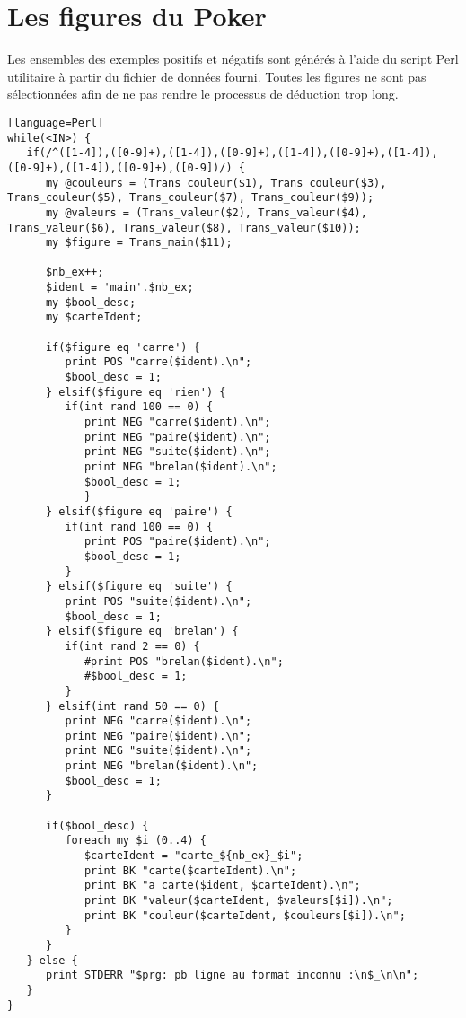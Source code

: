 \documentclass[a4paper,12pt]{article}
\begin{document}
\section{Les figures du Poker}

Les ensembles des exemples positifs et négatifs sont générés à l'aide du script Perl utilitaire à partir du fichier de données fourni. Toutes les figures ne sont pas sélectionnées afin de ne pas rendre le processus de déduction trop long.

\begin{lstlisting}[frame=single][language=Perl]
while(<IN>) {
   if(/^([1-4]),([0-9]+),([1-4]),([0-9]+),([1-4]),([0-9]+),([1-4]),([0-9]+),([1-4]),([0-9]+),([0-9])/) {
      my @couleurs = (Trans_couleur($1), Trans_couleur($3), Trans_couleur($5), Trans_couleur($7), Trans_couleur($9));
      my @valeurs = (Trans_valeur($2), Trans_valeur($4), Trans_valeur($6), Trans_valeur($8), Trans_valeur($10));
      my $figure = Trans_main($11);

      $nb_ex++;
      $ident = 'main'.$nb_ex;
      my $bool_desc;
      my $carteIdent;

      if($figure eq 'carre') {
         print POS "carre($ident).\n";
         $bool_desc = 1;
      } elsif($figure eq 'rien') {
         if(int rand 100 == 0) {
            print NEG "carre($ident).\n";
            print NEG "paire($ident).\n";
            print NEG "suite($ident).\n";
            print NEG "brelan($ident).\n";
            $bool_desc = 1;
            }
      } elsif($figure eq 'paire') {
         if(int rand 100 == 0) {
            print POS "paire($ident).\n";
            $bool_desc = 1;
         }
      } elsif($figure eq 'suite') {
         print POS "suite($ident).\n";
         $bool_desc = 1;
      } elsif($figure eq 'brelan') {
         if(int rand 2 == 0) {
            #print POS "brelan($ident).\n";
            #$bool_desc = 1;
         }
      } elsif(int rand 50 == 0) {
         print NEG "carre($ident).\n";
         print NEG "paire($ident).\n";
         print NEG "suite($ident).\n";
         print NEG "brelan($ident).\n";
         $bool_desc = 1;
      }

      if($bool_desc) {
         foreach my $i (0..4) {
            $carteIdent = "carte_${nb_ex}_$i";
            print BK "carte($carteIdent).\n";
            print BK "a_carte($ident, $carteIdent).\n";
            print BK "valeur($carteIdent, $valeurs[$i]).\n";
            print BK "couleur($carteIdent, $couleurs[$i]).\n";
         }
      }
   } else {
      print STDERR "$prg: pb ligne au format inconnu :\n$_\n\n";
   }
}
\end{lstlisting}
\end{document}
